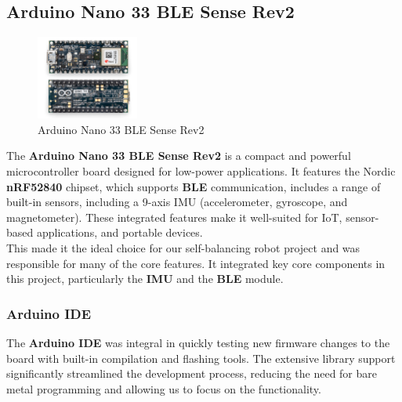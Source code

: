 \documentclass{article}
\begin{document}
\subsection{Arduino Nano 33 BLE Sense Rev2}

\begin{figure}[H]
    \centering
    \includegraphics[width=0.3\textwidth]{Figures/arduino.jpg} %
    \caption{Arduino Nano 33 BLE Sense Rev2}
    \label{fig:arduino}
\end{figure}

\begin{minipage}{\linewidth}
    The \textbf{Arduino Nano 33 BLE Sense Rev2}  is a compact and powerful microcontroller board
    designed for low-power applications. It features the Nordic \textbf{nRF52840} chipset,
    which supports \textbf{BLE} communication, includes a range of built-in sensors,
    including a 9-axis IMU (accelerometer, gyroscope, and magnetometer).
    These integrated features make it well-suited for IoT, sensor-based applications, and portable devices. \\

    This made it the ideal choice for our self-balancing robot project and was responsible for many of the core features.
    It integrated key core components in this project, particularly the \textbf{IMU} and the \textbf{BLE} module. \\
\end{minipage}


\subsubsection{Arduino IDE}

\begin{minipage}{\linewidth}
    The \textbf{Arduino IDE} was integral in quickly testing new firmware changes to the board with built-in compilation and flashing tools.
    The extensive library support significantly streamlined the development process, reducing the need for bare metal programming and allowing us to focus on the functionality.
\end{minipage}
\end{document}
